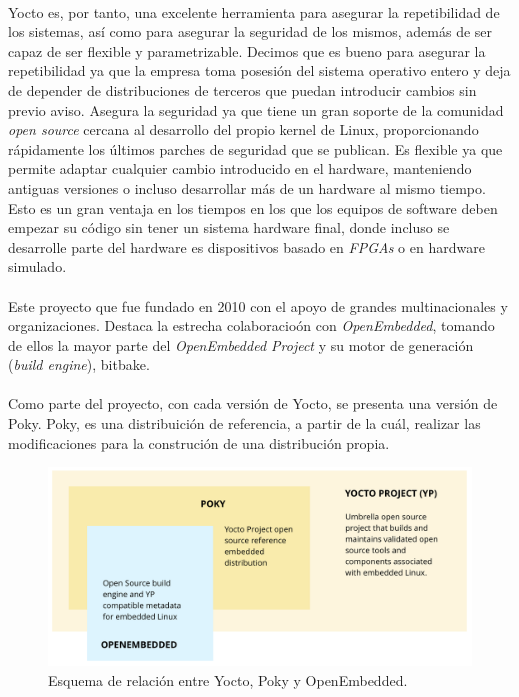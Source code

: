 \paragraph{} Yocto es, por tanto, una excelente herramienta para asegurar la repetibilidad
de los sistemas, así como para asegurar la seguridad de los mismos, además de ser capaz
de ser flexible y parametrizable. Decimos que es bueno para asegurar la repetibilidad
ya que la empresa toma posesión del sistema operativo entero y deja de depender de
distribuciones de terceros que puedan introducir cambios sin previo aviso. Asegura la
seguridad ya que tiene un gran soporte de la comunidad \emph{\gls{open source}} cercana
al desarrollo del propio kernel de Linux, proporcionando rápidamente los últimos parches
de seguridad que se publican. Es flexible ya que permite adaptar cualquier cambio
introducido en el hardware, manteniendo antiguas versiones o incluso desarrollar más de
un hardware al mismo tiempo. Esto es un gran ventaja en los tiempos en los que los equipos
de software deben empezar su código sin tener un sistema hardware final, donde incluso
se desarrolle parte del hardware es dispositivos basado en \emph{\gls{FPGAs}} o en
hardware simulado.

\paragraph{} Este proyecto que fue fundado en 2010 con el apoyo de grandes multinacionales
y organizaciones. Destaca la estrecha colaboracioón con \emph{OpenEmbedded}, tomando de
ellos la mayor parte del \emph{OpenEmbedded Project} y su motor de generación (\emph{build
engine}), bitbake.

\paragraph{} Como parte del proyecto, con cada versión de Yocto, se presenta una versión
de Poky. Poky, es una distribuición de referencia, a partir de la cuál, realizar las
modificaciones para la construción de una distribución propia.

\begin{figure}[h]
	\centering
	\includegraphics[width=0.60\linewidth]{figs/yocto-overview}
	\caption[Yocto Overview]{Esquema de relación entre Yocto, Poky y OpenEmbedded.}
	\label{fig:yocto_overview}
\end{figure}

